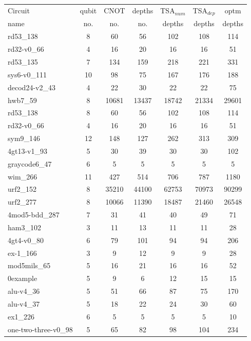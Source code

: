 \documentclass[runningheads]{llncs}
\begin{document}
\begin{table}[!ht]
	\begin{center}  
		\begin{tabular}{|p{4.3cm}<{\centering}|c|c|c|c|c|c|}
							\hline
							Circuit &  qubit  & CNOT &depths &TSA$_{num}$& TSA$_{dep}$  & optm 	  	\\
							 name	&   no. 	&	no. & no. & depths&  depths &  depths 	\\
							\hline
							rd53\_138 & 8 & 60 & 56 & 102 & 108 & 114 \\
							rd32-v0\_66 & 4 & 16 & 20 & 16 & 16 & 51 \\
rd53\_135 & 7 & 134 & 159 & 218 & 221 & 331 \\
sys6-v0\_111 & 10 & 98 & 75 & 167 & 176 & 188 \\
decod24-v2\_43 & 4 & 22 & 30 & 22 & 22 & 75 \\
hwb7\_59 & 8 & 10681 & 13437 & 18742 & 21334 & 29601 \\
rd53\_138 & 8 & 60 & 56 & 102 & 108 & 114 \\
rd32-v0\_66 & 4 & 16 & 20 & 16 & 16 & 51 \\
							sym9\_146 & 12 & 148 & 127 & 262 & 313 & 309 \\
4gt13-v1\_93 & 5 & 30 & 39 & 30 & 30 & 102 \\
graycode6\_47 & 6 & 5 & 5 & 5 & 5 & 5 \\
wim\_266 & 11 & 427 & 514 & 706 & 787 & 1180 \\
urf2\_152 & 8 & 35210 & 44100 & 62753 & 70973 & 90299 \\
urf2\_277 & 8 & 10066 & 11390 & 18487 & 21460 & 26548 \\
4mod5-bdd\_287 & 7 & 31 & 41 & 40 & 49 & 71 \\
ham3\_102 & 3 & 11 & 13 & 11 & 11 & 28 \\
4gt4-v0\_80 & 6 & 79 & 101 & 94 & 94 & 206 \\
							ex-1\_166 & 3 & 9 & 12 & 9 & 9 & 28 \\
							mod5mils\_65 & 5 & 16 & 21 & 16 & 16 & 52 \\
							0example & 5 & 9 & 6 & 12 & 15 & 15 \\
							alu-v4\_36 & 5 & 51 & 66 & 87 & 75 & 170 \\
							alu-v4\_37 & 5 & 18 & 22 & 24 & 30 & 60 \\
							ex1\_226 & 6 & 5 & 5 & 5 & 5 & 10 \\one-two-three-v0\_98 & 5 & 65 & 82 & 98 & 104 & 234 \\

\end{tabular}
\end{center}
\end{table}
\end{document}
